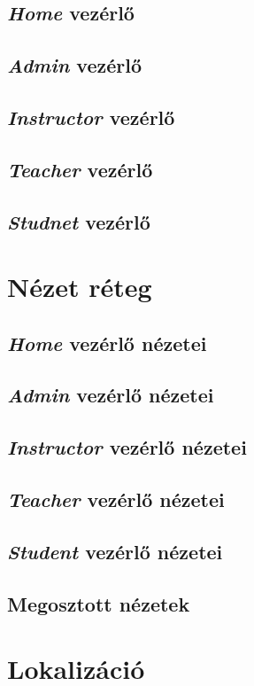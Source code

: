 \subsection{\emph{Home} vezérlő}
\subsection{\emph{Admin} vezérlő}
\subsection{\emph{Instructor} vezérlő}
\subsection{\emph{Teacher} vezérlő}
\subsection{\emph{Studnet} vezérlő}
\section{Nézet réteg}
\label{sec:view}
\subsection{\emph{Home} vezérlő nézetei}
\subsection{\emph{Admin} vezérlő nézetei}
\subsection{\emph{Instructor} vezérlő nézetei}
\subsection{\emph{Teacher} vezérlő nézetei}
\subsection{\emph{Student} vezérlő nézetei}
\subsection{Megosztott nézetek}
\section{Lokalizáció}
\label{sec:localization}
